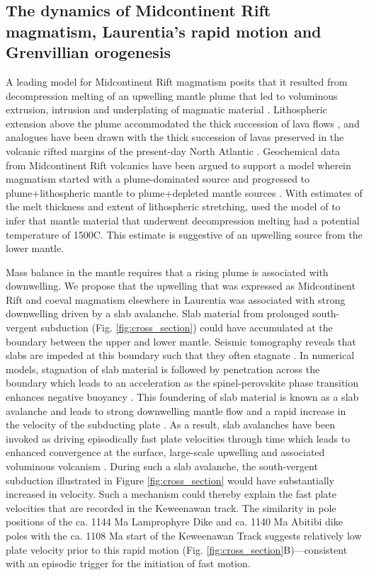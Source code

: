 \documentclass[11pt,letterpaper]{article}
\begin{document}
\subsection{The dynamics of Midcontinent Rift magmatism, Laurentia's rapid motion and Grenvillian orogenesis}

A leading model for Midcontinent Rift magmatism posits that it resulted from decompression melting of an upwelling mantle plume that led to voluminous extrusion, intrusion and underplating of magmatic material \citep{Hutchinson1990a}. Lithospheric extension above the plume accommodated the thick succession of lava flows \citep{Green1983a,Stein2015a}, and analogues have been drawn with the thick succession of lavas preserved in the volcanic rifted margins of the present-day North Atlantic \citep{Hutchinson1990a}. Geochemical data from Midcontinent Rift volcanics have been argued to support a model wherein magmatism started with a plume-dominated source and progressed to plume+lithospheric mantle to plume+depleted mantle sources \citep{Nicholson1990a,Shirey1994a,Shirey1997a}. With estimates of the melt thickness and extent of lithospheric stretching, \citet{Hutchinson1990a} used the model of \citet{White1989a} to infer that mantle material that underwent decompression melting had a potential temperature of 1500\textdegree C. This estimate is suggestive of an upwelling source from the lower mantle.

Mass balance in the mantle requires that a rising plume is associated with downwelling. We propose that the upwelling that was expressed as Midcontinent Rift and coeval magmatism elsewhere in Laurentia was associated with strong downwelling driven by a slab avalanche. Slab material from prolonged south-vergent subduction (Fig. \ref{fig:cross_section}) could have accumulated at the boundary between the upper and lower mantle. Seismic tomography reveals that slabs are impeded at this boundary such that they often stagnate \citep{Fukao2009a}. In numerical models, stagnation of slab material is followed by penetration across the boundary which leads to an acceleration as the spinel-perovskite phase transition enhances negative buoyancy \citep{Yang2016a}. This foundering of slab material is known as a slab avalanche and leads to strong downwelling mantle flow and a rapid increase in the velocity of the subducting plate \citep{Zhong1995a,ONeill2013a,Yang2016a}. As a result, slab avalanches have been invoked as driving episodically fast plate velocities through time which leads to enhanced convergence at the surface, large-scale upwelling and associated voluminous volcanism \citep{ONeill2013a}. During such a slab avalanche, the south-vergent subduction illustrated in Figure \ref{fig:cross_section} would have substantially increased in velocity. Such a mechanism could thereby explain the fast plate velocities that are recorded in the Keweenawan track. The similarity in pole positions of the ca. 1144 Ma Lamprophyre Dike and ca. 1140 Ma Abitibi dike poles with the ca. 1108 Ma start of the Keweenawan Track suggests relatively low plate velocity prior to this rapid motion (Fig. \ref{fig:cross_section}B)---consistent with an episodic trigger for the initiation of fast motion.
\end{document}
